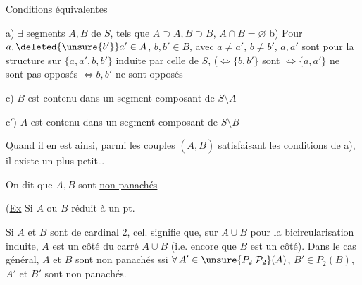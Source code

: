 Conditions équivalentes


a) $\exists$ segments $\bar A,\bar B$ de $S$, tels que $\bar A\supset A,\bar B\supset B$, $\bar A\cap\bar B=\varnothing$
b) Pour $a,\deleted{\unsure{b'}}a'\in A$, $b,b'\in B$, avec $a\ne a'$, $b\ne b'$,  $a,a'$ sont   pour la structure  sur  $\{a,a',b,b'\}$ induite par celle de $S$,  ($\Longleftrightarrow\{b,b'\}$ sont   $\Longleftrightarrow\{a,a'\}$ ne sont pas opposés $\Longleftrightarrow b,b'$ ne sont opposés

c) $B$ est contenu dans un segment composant de $S\setminus A$

c$'$) $A$ est contenu dans un segment composant de $S\setminus B$


Quand il en est ainsi, parmi les couples $(\bar A,\bar B)$  satisfaisant les conditions de a), il existe un plus petit\ldots

On dit que $A,B$ sont \uline{non panachés}

(\uline{Ex} Si  $A$ ou $B$ réduit à un pt. 

Si $A$ et $B$ sont de cardinal 2, cel. signifie que, sur $A\cup B$ pour la bicircularisation induite, $A$ est un côté du carré $A\cup B$ (i.e. encore que $B$ est un côté). Dans le cas général, $A$ et $B$ sont non panachés ssi $\forall\, A'\in\unsure{P_2|\mathcal P_2}(A)$, $B'\in P_2(B)$, $A'$ et $B'$ sont non panachés.


